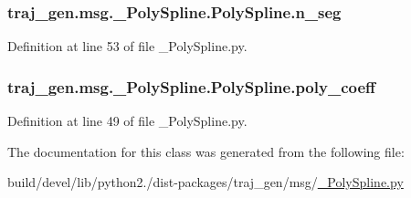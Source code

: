 \subsubsection[{\texorpdfstring{n\+\_\+seg}{n_seg}}]{\setlength{\rightskip}{0pt plus 5cm}traj\+\_\+gen.\+msg.\+\_\+\+Poly\+Spline.\+Poly\+Spline.\+n\+\_\+seg}\hypertarget{classtraj__gen_1_1msg_1_1___poly_spline_1_1_poly_spline_ab02eaeb5ab7d686f08611f296f3c6e4b}{}\label{classtraj__gen_1_1msg_1_1___poly_spline_1_1_poly_spline_ab02eaeb5ab7d686f08611f296f3c6e4b}


Definition at line 53 of file \+\_\+\+Poly\+Spline.\+py.

\subsubsection[{\texorpdfstring{poly\+\_\+coeff}{poly_coeff}}]{\setlength{\rightskip}{0pt plus 5cm}traj\+\_\+gen.\+msg.\+\_\+\+Poly\+Spline.\+Poly\+Spline.\+poly\+\_\+coeff}\hypertarget{classtraj__gen_1_1msg_1_1___poly_spline_1_1_poly_spline_ab1959a0acb17ab5f700218083585eb4a}{}\label{classtraj__gen_1_1msg_1_1___poly_spline_1_1_poly_spline_ab1959a0acb17ab5f700218083585eb4a}


Definition at line 49 of file \+\_\+\+Poly\+Spline.\+py.



The documentation for this class was generated from the following file\+:\begin{DoxyCompactItemize}
\item 
build/devel/lib/python2./dist-\/packages/traj\+\_\+gen/msg/\hyperlink{___poly_spline_8py}{\+\_\+\+Poly\+Spline.\+py}\end{DoxyCompactItemize}
